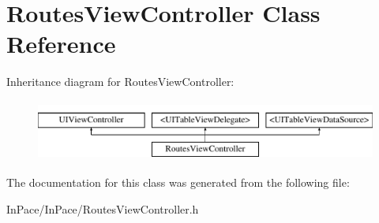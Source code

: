 \hypertarget{interfaceRoutesViewController}{\section{Routes\-View\-Controller Class Reference}
\label{interfaceRoutesViewController}
}
Inheritance diagram for Routes\-View\-Controller\-:\begin{figure}[H]
\begin{center}
\leavevmode
\includegraphics[height=2.000000cm]{interfaceRoutesViewController}
\end{center}
\end{figure}


The documentation for this class was generated from the following file\-:\begin{DoxyCompactItemize}
\item 
In\-Pace/\-In\-Pace/Routes\-View\-Controller.\-h\end{DoxyCompactItemize}
